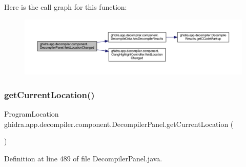 Here is the call graph for this function\+:
\nopagebreak
\begin{figure}[H]
\begin{center}
\leavevmode
\includegraphics[width=350pt]{classghidra_1_1app_1_1decompiler_1_1component_1_1_decompiler_panel_aa74cc3489415646273d63b999b658e30_cgraph}
\end{center}
\end{figure}
\mbox{\label{classghidra_1_1app_1_1decompiler_1_1component_1_1_decompiler_panel_a090d6e48e23de12508c47d06c6bad425}} 
\subsubsection{\texorpdfstring{getCurrentLocation()}{getCurrentLocation()}}
{\footnotesize\ttfamily Program\+Location ghidra.\+app.\+decompiler.\+component.\+Decompiler\+Panel.\+get\+Current\+Location (\begin{DoxyParamCaption}{ }\end{DoxyParamCaption})\hspace{0.3cm}{\ttfamily [inline]}}



Definition at line 489 of file Decompiler\+Panel.\+java.

